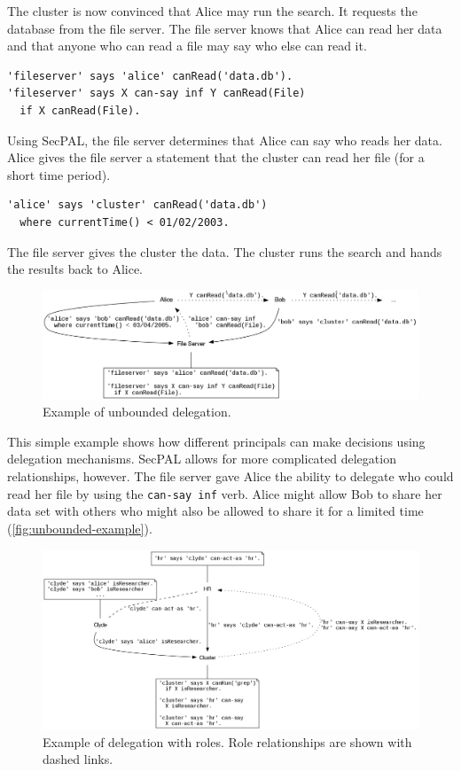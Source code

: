 \documentclass[thesis.tex]{subfiles}
\begin{document}
The cluster is now convinced that Alice may run the search.
It requests the database from the file server.  The file
server knows that Alice can read her data and that anyone who can read
a file may say who else can read it.
\begin{lstlisting}
'fileserver' says 'alice' canRead('data.db').
'fileserver' says X can-say inf Y canRead(File)
  if X canRead(File).
\end{lstlisting}
Using SecPAL, the file server determines that Alice can say who
reads her data.  Alice gives the file server a statement that
the cluster can read her file (for a short time
period).
\begin{lstlisting}
'alice' says 'cluster' canRead('data.db')
  where currentTime() < 01/02/2003.
\end{lstlisting}
The file server gives the cluster the data.
The cluster runs the search and hands the results back to Alice.

\begin{figure}
  \centering
  \includegraphics[width=\textwidth]{figures/secpal-example-delegation.png}
  \caption{Example of unbounded delegation.}
  \label{fig:unbounded-example}
\end{figure}

This simple example shows how different principals can make decisions using delegation mechanisms.
SecPAL allows for more complicated delegation relationships, however. 
The file server gave Alice the ability to delegate who could read her file by using the \texttt{can-say inf} verb.
Alice might allow Bob to share her data set with others who might also be allowed to share it for a limited time (\autoref{fig:unbounded-example}).

\begin{figure}
  \centering
  \includegraphics[width=\textwidth]{figures/secpal-example-roles.png}
  \caption[Example of delegation with roles.]{Example of delegation with roles.  Role relationships are shown with dashed links.}
  \label{fig:roles-example}
\end{figure}
\end{document}
